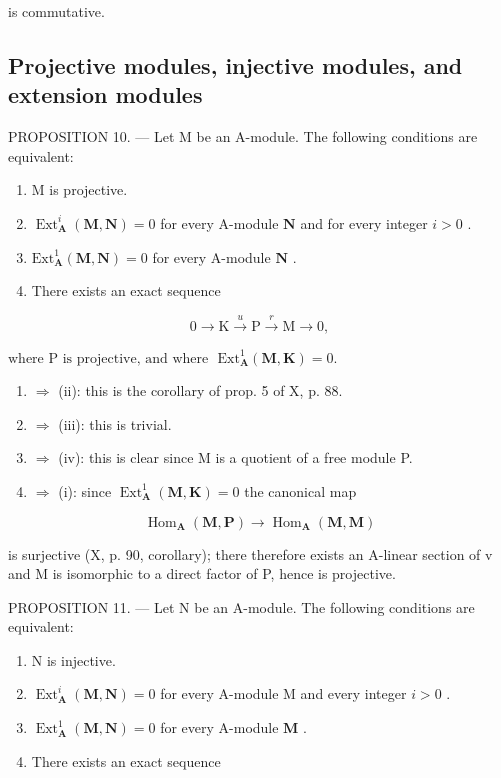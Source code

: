 is commutative.

\subsection{Projective modules, injective modules, and extension modules}

PROPOSITION 10. --- Let M be an A-module. The following conditions are equivalent:

\begin{enumerate}
\def\labelenumi{(\roman{enumi})}
\item
  M is projective.
\item
  \(\operatorname{Ext}_{\mathbf{A}}^{i}(\mathbf{M},\mathbf{N}) = 0\) for every A-module \(\mathbf{N}\) and for every integer \(i > 0\) .
\item
  \(\mathrm{Ext}_{\mathbf{A}}^{1}(\mathbf{M},\mathbf{N}) = 0\) for every A-module \(\mathbf{N}\) .
\item
  There exists an exact sequence
\end{enumerate}

\[
0 \rightarrow \mathrm{K} \xrightarrow {u} \mathrm{P} \xrightarrow {r} \mathrm{M} \rightarrow 0,
\]

\(\text{where P is projective, and where } \text{ Ext}_{\mathbf{A}}^{1}(\mathbf{M}, \mathbf{K}) = 0.\)

\begin{enumerate}
\def\labelenumi{(\roman{enumi})}
\item
  \(\Rightarrow\) (ii): this is the corollary of prop. 5 of X, p. 88.
\item
  \(\Rightarrow\) (iii): this is trivial.
\item
  \(\Rightarrow\) (iv): this is clear since M is a quotient of a free module P.
\item
  \(\Rightarrow\) (i): since \(\operatorname{Ext}_{\mathbf{A}}^{1}(\mathbf{M},\mathbf{K}) = 0\) the canonical map
\end{enumerate}

\[
\operatorname{Hom} _ {\mathbf {A}} (\mathbf {M}, \mathbf {P}) \rightarrow \operatorname{Hom} _ {\mathbf {A}} (\mathbf {M}, \mathbf {M})
\]

is surjective (X, p. 90, corollary); there therefore exists an A-linear section of v and M is isomorphic to a direct factor of P, hence is projective.

PROPOSITION 11. --- Let N be an A-module. The following conditions are equivalent:

\begin{enumerate}
\def\labelenumi{(\roman{enumi})}
\item
  N is injective.
\item
  \(\operatorname{Ext}_{\mathbf{A}}^{i}(\mathbf{M},\mathbf{N}) = 0\) for every A-module M and every integer \(i > 0\) .
\item
  \(\operatorname{Ext}_{\mathbf{A}}^{1}(\mathbf{M},\mathbf{N}) = 0\) for every A-module \(\mathbf{M}\) .
\item
  There exists an exact sequence
\end{enumerate}

